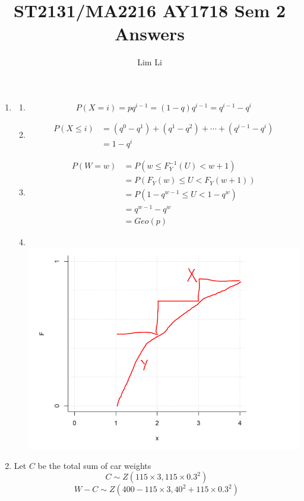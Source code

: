 \documentclass[12pt]{article}
\theoremstyle{definition}
\begin{document}
\title{ST2131/MA2216 AY1718 Sem 2 Answers}
\author{Lim Li}
\maketitle

\begin{enumerate}
\item 
\begin{enumerate}[label=(\alph*)]
\item
\[P(X=i) = pq^{i-1} = (1-q)q^{i-1} = q^{i-1} - q^i\]
\item
\begin{align*}
P(X \leq i) &= (q^0 - q^1) + (q^1 - q^2) + \cdots + (q^{i-1} - q^i) \\
    &= 1-q^i
\end{align*}
\item
\begin{align*}
P(W=w) &= P(w \leq F_Y^{-1}(U) < w+1) \\
    &= P(F_Y(w) \leq U < F_Y(w+1)) \\
    &= P(1-q^{w-1} \leq U < 1-q^w) \\
    &= q^{w-1} - q^w \\
    &= Geo(p)
\end{align*}
\item
\ \\
\includegraphics[scale=0.8]{graph.png}
\end{enumerate}
\item Let $C$ be the total sum of car weights
\[C \sim Z(115 \times 3, 115 \times 0.3^2)\]
\[W - C \sim Z(400 - 115 \times 3, 40^2 + 115 \times 0.3^2)\]
\begin{align*}

\end{align*}
\end{enumerate}
\end{document}
